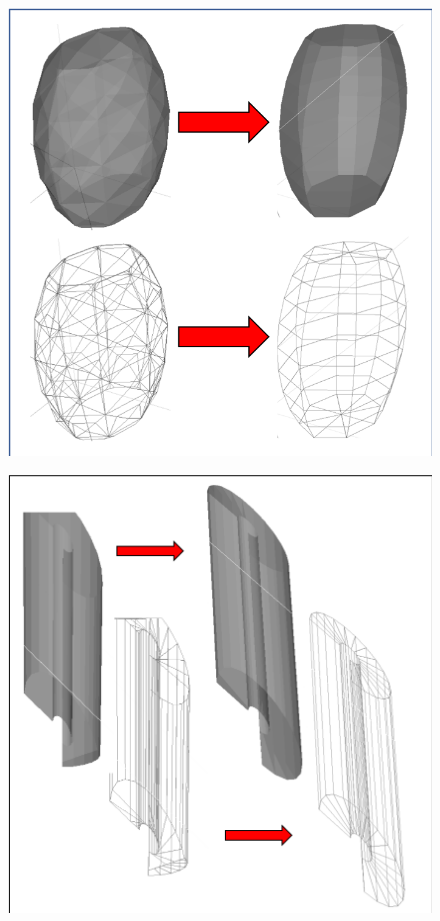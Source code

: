 \documentclass[12pt,a4paper]{article}
\begin{document}
\begin{figure}[h!]
\centering
\begin{minipage}{.4\textwidth}
  \centering
  \includegraphics[height=1\linewidth]{Images//Meshes//Ellipsoid.png}
  \label{ellipme}
\end{minipage}%
\begin{minipage}{.4\textwidth}
  \centering
  \includegraphics[height=1\linewidth]{Images//Meshes//CutTubs.png}
  \label{ct}
\end{minipage}%
\end{figure}
\end{document}
